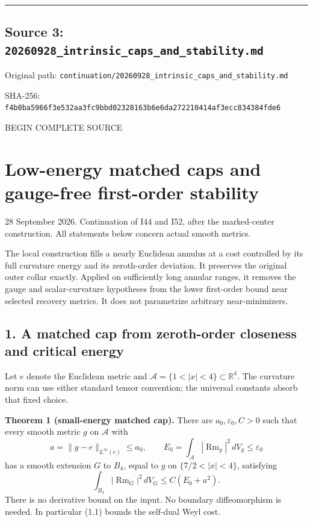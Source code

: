 \documentclass[
  10pt,
]{article}
\begin{document}
\begin{center}\rule{0.5\linewidth}{0.5pt}\end{center}

\hypertarget{source-3-20260928_intrinsic_caps_and_stability.md}{%
\subsection{Source 3:
\nolinkurl{20260928_intrinsic_caps_and_stability.md}}\label{source-3-20260928_intrinsic_caps_and_stability.md}}

Original path:
\nolinkurl{continuation/20260928_intrinsic_caps_and_stability.md}

SHA-256:
\nolinkurl{f4b0ba5966f3e532aa3fc9bbd02328163b6e6da272210414af3ecc834384fde6}

BEGIN COMPLETE SOURCE

\hypertarget{low-energy-matched-caps-and-gauge-free-first-order-stability}{%
\section{Low-energy matched caps and gauge-free first-order
stability}\label{low-energy-matched-caps-and-gauge-free-first-order-stability}}

28 September 2026. Continuation of I44 and I52, after the marked-center
construction. All statements below concern actual smooth metrics.

The local construction fills a nearly Euclidean annulus at a cost
controlled by its full curvature energy and its zeroth-order deviation.
It preserves the original outer collar exactly. Applied on sufficiently
long annular ranges, it removes the gauge and scalar-curvature
hypotheses from the lower first-order bound near selected recovery
metrics. It does not parametrize arbitrary near-minimizers.

\hypertarget{a-matched-cap-from-zeroth-order-closeness-and-critical-energy}{%
\subsection{1. A matched cap from zeroth-order closeness and critical
energy}\label{a-matched-cap-from-zeroth-order-closeness-and-critical-energy}}

Let \(e\) denote the Euclidean metric and
\(\mathcal A=\{1<|x|<4\}\subset\mathbb R^4\). The curvature norm can use
either standard tensor convention; the universal constants absorb that
fixed choice.

\textbf{Theorem 1 (small-energy matched cap).} There are
\(a_0,\varepsilon_0,C>0\) such that every smooth metric \(g\) on
\(\mathcal A\) with \[
 a=\|g-e\|_{L^\infty(e)}\le a_0,\qquad
 E_0=\int_{\mathcal A}|\operatorname{Rm}_g|^2\,dV_g
          \le\varepsilon_0
\] has a smooth extension \(G\) to \(B_4\), equal to \(g\) on
\(\{7/2<|x|<4\}\), satisfying \[
 \int_{B_4}|\operatorname{Rm}_G|^2\,dV_G
                         \le C(E_0+a^2).                    \tag{1.1}
\] There is no derivative bound on the input. No boundary diffeomorphism
is needed. In particular (1.1) bounds the self-dual Weyl cost.
\end{document}
